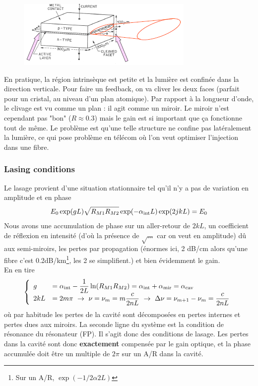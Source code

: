 	\begin{figure}
	\vspace{-5mm}
	\includegraphics[scale=0.85]{ch4/image13}
	\end{figure}
En pratique, la région intrinsèque est petite et la lumière est confinée dans la direction verticale.
Pour faire un feedback, on va cliver les deux faces (parfait pour un cristal, au niveau d'un plan
atomique). Par rapport à la longueur d'onde, le clivage est vu comme un plan : il agit comme un
miroir. Le miroir n'est cependant pas "bon" ($R\approx0.3$) mais le gain est si important que ça
fonctionne tout de même. Le problème est qu'une telle structure ne confine pas latéralement la 
lumière, ce qui pose problème en télécom où l'on veut optimiser l'injection dans une fibre.

\subsubsection{Lasing conditions}
Le lasage provient d'une situation stationnaire tel qu'il n'y a pas de variation en amplitude et en
phase
\begin{equation}
{E_0}\exp (gL)\sqrt {{R_{M1}}{R_{M2}}} \exp ( - {\alpha _{{\mathop{\rm int}} }}L)\exp (2jkL) = {E_0}
\end{equation}
Nous avons une accumulation de phase sur un aller-retour de $2kL$, un coefficient de réflexion en
intensité (d'où la présence de $\sqrt{\dots}$ car on veut en amplitude) dû aux semi-miroirs, les
pertes par propagation (énormes ici, 2 dB/cm alors qu'une fibre c'est 0.2dB/km\footnote{Sur un A/R,
$\exp(-1/2 \alpha 2L)$}, les 2 se simplifient.) et bien évidemment le gain.\\

En en tire
\begin{equation}
\left\{\begin{array}{ll}
g &\DS= {\alpha _{{\mathop{\rm int}} }} - \frac{1}{{2L}}\ln ({R_{M1}}{R_{M2}}) = {\alpha _{{\mathop{\rm int}} }} + {\alpha _{{\rm{mir}}}} = {\alpha _{{\rm{cav}}}}\\
2kL &\DS= 2m\pi\ \to\ \nu  = {\nu _m} = m\frac{c}{{2nL}}\ \to\ \Delta \nu  = {\nu _{m + 1}} - {\nu _m} =
 \frac{c}{{2nL}}
\end{array}\right.
\end{equation}
où par habitude les pertes de la cavité sont décomposées en pertes internes et pertes dues aux miroirs.
La seconde ligne du système est la condition de résonance du résonateur (FP). Il s'agit donc des 
conditions de lasage. Les pertes dans la cavité sont donc \textbf{exactement} compensée par le gain
optique, et la phase accumulée doit être un multiple de $2\pi$ sur un A/R dans la cavité.

